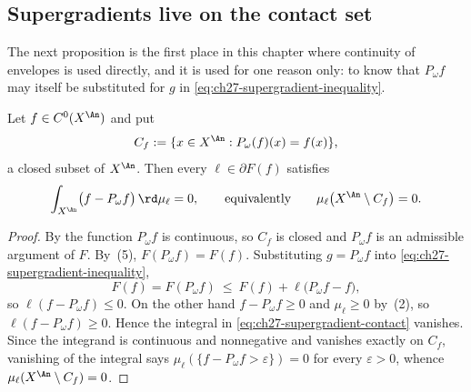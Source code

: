 \subsection{Supergradients live on the contact set}
\label{sec:ch27-contact-support}

The next proposition is the first place in this chapter where continuity of
envelopes is used directly, and it is used for one reason only: to know that
\(P_\omega f\) may itself be substituted for \(g\) in
\eqref{eq:ch27-supergradient-inequality}.

\begin{proposition}
\label{prop:ch27-supergradients-on-contact}
Let \(f\in C^0(X^{\An})\) and put
\begin{equation}\label{eq:ch27-contact-set}
 C_f:=\{x\in X^{\An}: P_\omega(f)(x)=f(x)\},
\end{equation}
a closed subset of \(X^{\An}\).  Then every \(\ell\in\partial F(f)\)
satisfies
\begin{equation}\label{eq:ch27-supergradient-contact}
 \int_{X^{\An}}\bigl(f-P_\omega f\bigr)\,\rd\mu_\ell=0,
 \qquad\text{equivalently}\qquad
 \mu_\ell\bigl(X^{\An}\setminus C_f\bigr)=0 .
\end{equation}
\end{proposition}

\begin{proof}
By  the function \(P_\omega f\) is
continuous, so \(C_f\) is closed and \(P_\omega f\) is an admissible
argument of \(F\).  By \,(5),
\(F(P_\omega f)=F(f)\).  Substituting \(g=P_\omega f\) into
\eqref{eq:ch27-supergradient-inequality},
\[
 F(f)=F(P_\omega f)\ \leq\ F(f)+\ell\bigl(P_\omega f-f\bigr),
\]
so \(\ell(f-P_\omega f)\leq0\).  On the other hand \(f-P_\omega f\geq0\) and
\(\mu_\ell\geq0\) by \,(2), so
\(\ell(f-P_\omega f)\geq0\).  Hence the integral in
\eqref{eq:ch27-supergradient-contact} vanishes.  Since the integrand is
continuous and nonnegative and vanishes exactly on \(C_f\), vanishing of the
integral says \(\mu_\ell(\{f-P_\omega f>\varepsilon\})=0\) for every
\(\varepsilon>0\), whence \(\mu_\ell(X^{\An}\setminus C_f)=0\).
\end{proof}

\begin{center}
\end{center}

